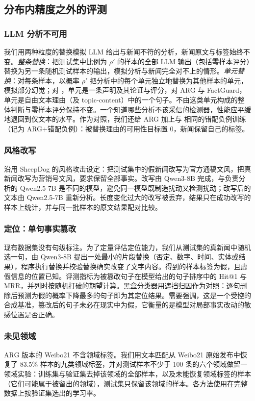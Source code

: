 \subsection{分布内精度之外的评测}\label{sec:robust-sets}

\subsubsection{LLM 分析不可用}
我们用两种粒度的替换模拟 LLM 给出与新闻不符的分析，新闻原文与标签始终不变。\emph{整条替换}：把测试集中比例为 $\rho'$ 的样本的全部 LLM 输出（包括零样本评分）替换为另一条随机测试样本的输出，模拟分析与新闻完全对不上的情形。\emph{单元替换}：对每条样本，以概率 $\rho'$ 把分析中的每个单元独立地替换为其他样本的单元，模拟部分幻觉；对 \method{}，单元是一条声明及其论证与评分，对 ARG 与 FactGuard，单元是自由文本理由（及 topic-content）中的一个句子。不由这类单元构成的整体判断与零样本评分保持不变。一个知道哪些分析不该采信的检测器，性能应平缓地退回到仅文本的水平。作为对照，我们还给 ARG 加上与 \method{} 相同的错配负例训练（记为 ARG+错配负例）：被替换理由的可用性目标置 0，新闻保留自己的标签。

\subsubsection{风格改写}
沿用 SheepDog\citep{wu2024sheepdog} 的风格攻击设定：把测试集中的假新闻改写为官方通稿文风，把真新闻改写为营销号文风，要求保留全部事实。改写由 Qwen3-8B\citep{qwen3} 完成，与负责分析的 Qwen2.5-7B 是不同的模型，避免同一模型既制造扰动又检测扰动；改写后的文本由 Qwen2.5-7B 重新分析。长度变化过大的改写被丢弃，结果只在成功改写的样本上统计，并与同一批样本的原文结果配对比较。

\subsubsection{定位：单句事实篡改}
现有数据集没有句级标注。为了定量评估定位能力，我们从测试集的真新闻中随机选一句，由 Qwen3-8B 提出一处最小的片段替换（否定、数字、时间、实体或结果），程序执行替换并校验替换确实改变了文字内容。得到的样本标签为假，且虚假信息的位置已知。评测指标为被篡改句子在模型给出的句子排序中的 Hit@1 与 MRR，并列时按随机打破的期望计算。黑盒分类器用遮挡归因\citep{li2016understanding}作为对照：逐句删除后预测为假的概率下降最多的句子即为其定位结果。需要强调，这是一个受控的合成基准，篡改后的句子未必在现实中为假，它衡量的是模型对局部事实改动的敏感位置是否正确。

\subsubsection{未见领域}
ARG 版本的 Weibo21 不含领域标签。我们用文本匹配从 Weibo21 原始发布中恢复了 83.5\% 样本的九类领域标签，并对测试样本不少于 100 条的六个领域做留一领域实验：训练集与验证集去掉该领域的全部样本，以及未能恢复领域标签的样本（它们可能属于被留出的领域），测试集只保留该领域的样本。各方法使用在完整数据上按验证集选出的学习率。


